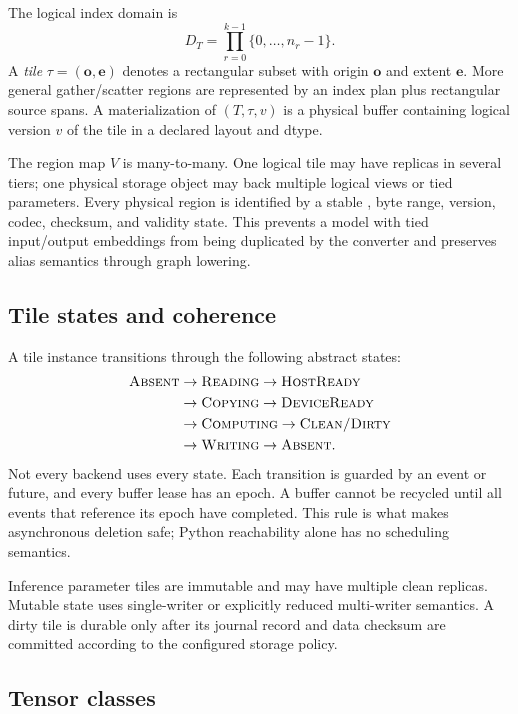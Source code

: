 The logical index domain is
\[
  D_T=\prod_{r=0}^{k-1}\{0,\ldots,n_r-1\}.
\]
A \emph{tile} $\tau=(\mathbf o,\mathbf e)$ denotes a rectangular subset with origin $\mathbf o$ and extent $\mathbf e$. More general gather/scatter regions are represented by an index plan plus rectangular source spans. A materialization of $(T,\tau,v)$ is a physical buffer containing logical version $v$ of the tile in a declared layout and dtype.

The region map $V$ is many-to-many. One logical tile may have replicas in several tiers; one physical storage object may back multiple logical views or tied parameters. Every physical region is identified by a stable , byte range, version, codec, checksum, and validity state. This prevents a model with tied input/output embeddings from being duplicated by the converter and preserves alias semantics through graph lowering.

\subsection{Tile states and coherence}

A tile instance transitions through the following abstract states:
\[
\begin{aligned}
\textsc{Absent}&\rightarrow\textsc{Reading}\rightarrow\textsc{HostReady}\\
&\rightarrow\textsc{Copying}\rightarrow\textsc{DeviceReady}\\
&\rightarrow\textsc{Computing}\rightarrow\textsc{Clean/Dirty}\\
&\rightarrow\textsc{Writing}\rightarrow\textsc{Absent}.
\end{aligned}
\]
Not every backend uses every state. Each transition is guarded by an event or future, and every buffer lease has an epoch. A buffer cannot be recycled until all events that reference its epoch have completed. This rule is what makes asynchronous deletion safe; Python reachability alone has no scheduling semantics.

Inference parameter tiles are immutable and may have multiple clean replicas. Mutable state uses single-writer or explicitly reduced multi-writer semantics. A dirty tile is durable only after its journal record and data checksum are committed according to the configured storage policy.

\subsection{Tensor classes}


